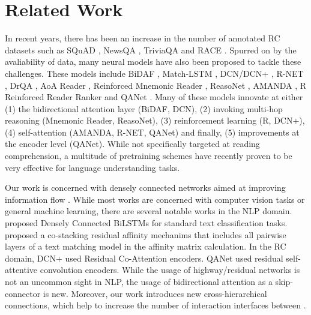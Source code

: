 \documentclass{article}
\begin{document}
\section{Related Work}
In recent years, there has been an increase in the number of annotated RC datasets such as SQuAD \citep{rajpurkar2016squad}, NewsQA \citep{trischler2016newsqa}, TriviaQA \citep{joshi2017triviaqa} and RACE \citep{lai2017race}. Spurred on by the avaliability of data, many neural models have also been proposed to tackle these challenges. These models include BiDAF \citep{seo2016bidirectional}, Match-LSTM \citep{wang2016machine}, DCN/DCN+ \citep{DBLP:journals/corr/XiongZS16,xiong2017dcn+}, R-NET \citep{wang2017gated}, DrQA \citep{chen2017reading}, AoA Reader \citep{cui2016attention}, Reinforced Mnemonic Reader \citep{hu2017mnemonic}, ReasoNet \citep{shen2017reasonet}, AMANDA \citep{kundu2018amanda}, R Reinforced Reader Ranker \citep{wang2017r} and QANet \citep{yu2018qanet}. Many of these models innovate at either (1) the bidirectional attention layer (BiDAF, DCN), (2) invoking multi-hop reasoning (Mnemonic Reader, ReasoNet), (3) reinforcement learning (R, DCN+), (4) self-attention (AMANDA, R-NET, QANet) and finally, (5) improvements at the encoder level (QANet). While not specifically targeted at reading comprehension, a multitude of pretraining schemes \citep{mccann2017learned,peters2018deep,radford2018improving,1810.04805} have recently proven to be very effective for language understanding tasks.

Our work is concerned with densely connected networks aimed at improving information flow \citep{DBLP:conf/cvpr/HuangLMW17,DBLP:journals/corr/SrivastavaGS15,szegedy2015going}. While most works are concerned with computer vision tasks or general machine learning, there are several notable works in the NLP domain. \cite{ding2018densely} proposed Densely Connected BiLSTMs for standard text classification tasks. \citep{tay2018co} proposed a co-stacking residual affinity mechanims that includes all pairwise layers of a text matching model in the affinity matrix calculation. In the RC domain, DCN+ \citep{xiong2017dcn+} used Residual Co-Attention encoders. QANet \citep{yu2018qanet} used residual self-attentive convolution encoders. While the usage of highway/residual networks is not an uncommon sight in NLP, the usage of bidirectional attention as a skip-connector is new. Moreover, our work introduces new cross-hierarchical connections, which help to increase the number of interaction interfaces between .
\end{document}
